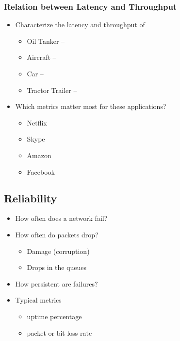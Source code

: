 \subsubsection{Relation between Latency and Throughput}
\begin{itemize}[nosep]
    \item Characterize the latency and throughput of
          \begin{itemize}[nosep]
              \item Oil Tanker --
              \item Aircraft --
              \item Car --
              \item Tractor Trailer --
          \end{itemize}
    \item Which metrics matter most for these applications?
          \begin{itemize}[nosep]
              \item Netflix
              \item Skype
              \item Amazon
              \item Facebook
          \end{itemize}
\end{itemize}
\subsection{Reliability}
\begin{itemize}[nosep]
    \item How often does a network fail?
    \item How often do packets drop?
          \begin{itemize}[nosep]
              \item Damage (corruption)
              \item Drops in the queues
          \end{itemize}
    \item How persistent are failures?
    \item Typical metrics
          \begin{itemize}[nosep]
              \item uptime percentage
              \item packet or bit loss rate
          \end{itemize}
\end{itemize}

